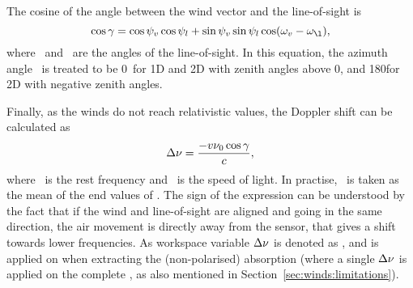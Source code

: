The cosine of the angle between the wind vector and the line-of-sight is
\begin{equation}
  \cos\gamma = \cos\aZntAng{\Wind}\cos\aZntAng{l} + 
               \sin\aZntAng{\Wind}\sin\aZntAng{l}
               \cos(\aAzmAng{\Wind}-\aAzmAng{\l}),
  \label{eq:winds:dang}
\end{equation}
where \ and \ are the angles of the line-of-sight. In
this equation, the azimuth angle \ is treated to be 0\degree\ for 1D
and 2D with zenith angles above 0, and 180\degree for 2D with negative zenith
angles.

Finally, as the winds do not reach relativistic values, the Doppler shift can
be calculated as
\begin{equation}
  \Delta\nu = \frac{-v\nu_{0}\cos\gamma}{c},
  \label{eq:winds:aa}
\end{equation}
where \ is the rest frequency and \speedoflight\ is the speed of light.
In practise, \ is taken as the mean of the end values of
. The sign of the expression can be understood by the fact
that if the wind and line-of-sight are aligned and going in the same direction,
the air movement is directly away from the sensor, that gives a shift towards
lower frequencies. As workspace variable $\Delta\nu$ is denoted as
, and is applied on  when extracting
the (non-polarised) absorption (where a single $\Delta\nu$ is applied on the
complete , as also mentioned in
Section~\ref{sec:winds:limitations}).

